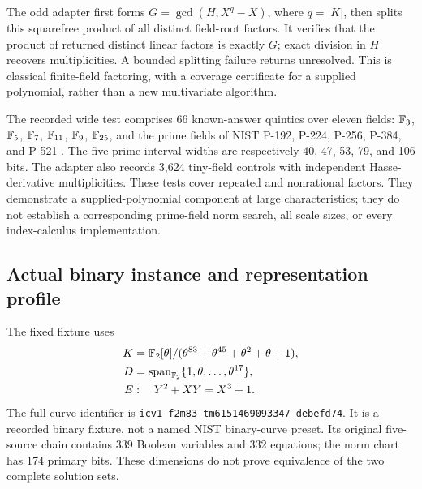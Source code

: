 The odd adapter first forms $G=\gcd(H,X^q-X)$, where $q=|K|$,
then splits this squarefree product of all distinct field-root factors.
It verifies that the product of returned distinct linear factors is exactly
$G$; exact division in $H$ recovers multiplicities. A bounded splitting
failure returns unresolved. This is classical finite-field factoring,
with a coverage certificate for a supplied polynomial, rather than a new
multivariate algorithm.

The recorded wide test comprises 66 known-answer quintics over eleven
fields: $\mathbb F_3$, $\mathbb F_5$, $\mathbb F_7$, $\mathbb F_{11}$, $\mathbb F_9$, $\mathbb F_{25}$, and the prime fields
of NIST P-192, P-224, P-256, P-384, and P-521 .
The five prime interval widths are respectively 40, 47, 53, 79, and 106
bits. The adapter also records 3,624 tiny-field controls with independent
Hasse-derivative multiplicities. These tests cover repeated and nonrational
factors. They demonstrate a supplied-polynomial component at large
characteristics; they do not establish a corresponding prime-field norm
search, all scale sizes, or every index-calculus implementation.

\subsection{Actual binary instance and representation profile}
The fixed fixture  uses
\[
 \begin{split}
 K&=\mathbb F_2[\theta]/(\theta^{83}+\theta^{45}+\theta^2+\theta+1),\\
 D&=\operatorname{span}_{\mathbb F_2}\{1,\theta,\ldots,\theta^{17}\},\\
 E&:\quad Y^2+XY=X^3+1 .
 \end{split}
\]
The full curve identifier is
\texttt{icv1-f2m83-tm6151469093347-debefd74}.
It is a recorded binary fixture, not a named NIST binary-curve preset.
Its original five-source chain contains 339 Boolean variables and 332
equations; the norm chart has 174 primary bits. These dimensions do not
prove equivalence of the two complete solution sets.

